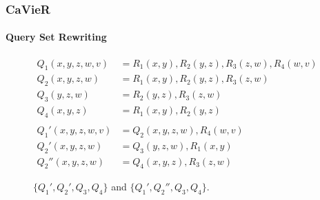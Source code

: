\documentclass[
	11pt, %
]{beamer}
\begin{document}
\begin{frame}
	\frametitle{CaVieR}
	\framesubtitle{Query Set Rewriting}
	\begin{figure}
		\begin{align*}
			Q_1(x,y,z,w,v) &= R_1(x,y), R_2(y,z), R_3(z,w), R_4(w,v)&\\
			Q_2(x,y,z,w) &= R_1(x,y), R_2(y,z), R_3(z,w) &\\
			Q_3(y,z,w) &= R_2(y,z), R_3(z,w)&\\
			Q_4(x,y,z) &= R_1(x,y), R_2(y,z)&\\\\
			Q_1'(x,y,z,w,v)& = Q_2(x,y,z,w), R_4(w,v)&\\
			Q_2'(x,y,z,w)& = Q_3(y,z,w), R_1(x,y)&\\
			Q_2''(x,y,z,w)& = Q_4(x,y,z), R_3(z,w)&
		\end{align*}
		
		$\{Q_1', Q_2', Q_3, Q_4\}$ and $\{Q_1', Q_2'', Q_3, Q_4\}$.
	\end{figure}
\end{frame}

\end{document}
